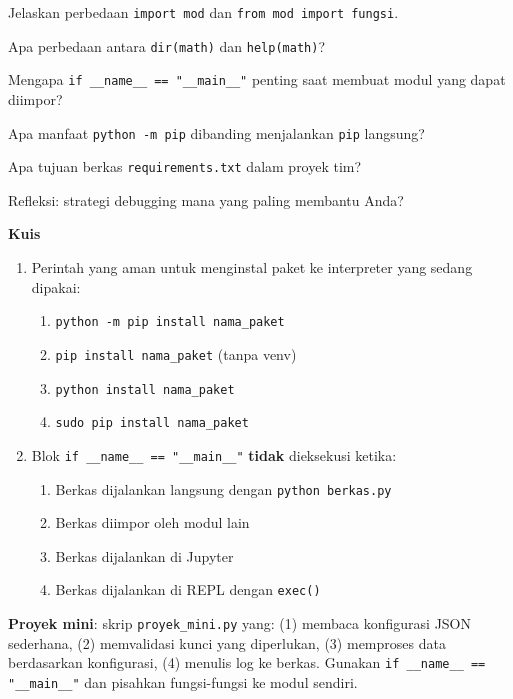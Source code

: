 \documentclass[../main.tex]{subfiles}
\begin{document}
\begin{latihan}
  \item Jelaskan perbedaan \texttt{import mod} dan \texttt{from mod import fungsi}.
  \item Apa perbedaan antara \texttt{dir(math)} dan \texttt{help(math)}?
  \item Mengapa \texttt{if \_\_name\_\_ == "\_\_main\_\_"} penting saat membuat modul yang dapat diimpor?
  \item Apa manfaat \texttt{python -m pip} dibanding menjalankan \texttt{pip} langsung?
  \item Apa tujuan berkas \texttt{requirements.txt} dalam proyek tim?
  \item Refleksi: strategi debugging mana yang paling membantu Anda?
\end{latihan}

\begin{asesmen}
\textbf{Kuis}

\begin{enumerate}
  \item Perintah yang aman untuk menginstal paket ke interpreter yang sedang dipakai:
  \begin{enumerate}
    \item \texttt{python -m pip install nama\_paket}
    \item \texttt{pip install nama\_paket} (tanpa venv)
    \item \texttt{python install nama\_paket}
    \item \texttt{sudo pip install nama\_paket}
  \end{enumerate}
  \item Blok \texttt{if \_\_name\_\_ == "\_\_main\_\_"} \textbf{tidak} dieksekusi ketika:
  \begin{enumerate}
    \item Berkas dijalankan langsung dengan \texttt{python berkas.py}
    \item Berkas diimpor oleh modul lain
    \item Berkas dijalankan di Jupyter
    \item Berkas dijalankan di REPL dengan \texttt{exec()}
  \end{enumerate}
\end{enumerate}

\textbf{Proyek mini}: skrip \texttt{proyek\_mini.py} yang: (1) membaca konfigurasi JSON sederhana, (2) memvalidasi kunci yang diperlukan, (3) memproses data berdasarkan konfigurasi, (4) menulis log ke berkas. Gunakan \texttt{if \_\_name\_\_ == "\_\_main\_\_"} dan pisahkan fungsi-fungsi ke modul sendiri.
\end{asesmen}
\end{document}
